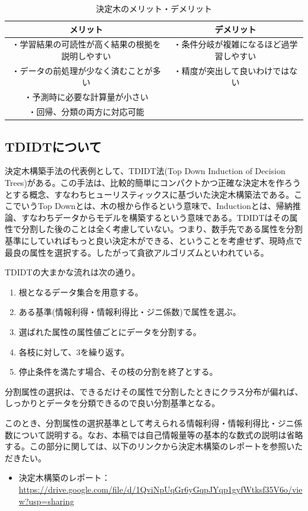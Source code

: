\documentclass[dvipdfmx]{jsarticle}
\begin{document}
\begin{table}[H]
  \begin{center}
    \caption{決定木のメリット・デメリット}
    \begin{tabular}{|c|c|} \hline
      メリット & デメリット \\ \hline
      ・学習結果の可読性が高く結果の根拠を説明しやすい & ・条件分岐が複雑になるほど過学習しやすい\\
      ・データの前処理が少なく済むことが多い & ・精度が突出して良いわけではない\\
      ・予測時に必要な計算量が小さい & \\
      ・回帰、分類の両方に対応可能 &　\\ \hline
    \end{tabular}
    \label{hyo01}
  \end{center}
\end{table}
\subsection{TDIDTについて}
決定木構築手法の代表例として、TDIDT法(Top Down Induction of Decision Trees)がある。この手法は、比較的簡単にコンパクトかつ正確な決定木を作ろうとする概念、すなわちヒューリスティックスに基づいた決定木構築法である。ここでいうTop Downとは、木の根から作るという意味で、Inductionとは、帰納推論、すなわちデータからモデルを構築するという意味である。TDIDTはその属性で分割した後のことは全く考慮していない。つまり、数手先である属性を分割基準にしていればもっと良い決定木ができる、ということを考慮せず、現時点で最良の属性を選択する。したがって貪欲アルゴリズムといわれている。\par
TDIDTの大まかな流れは次の通り。
\begin{enumerate}
  \item 根となるデータ集合を用意する。
  \item ある基準(情報利得・情報利得比・ジニ係数)で属性を選ぶ。
  \item 選ばれた属性の属性値ごとにデータを分割する。
  \item 各枝に対して、3を繰り返す。
  \item 停止条件を満たす場合、その枝の分割を終了とする。
\end{enumerate}
分割属性の選択は、できるだけその属性で分割したときにクラス分布が偏れば、しっかりとデータを分類できるので良い分割基準となる。\par
このとき、分割属性の選択基準として考えられる情報利得・情報利得比・ジニ係数について説明する。なお、本稿では自己情報量等の基本的な数式の説明は省略する。この部分に関しては、以下のリンクから決定木構築のレポートを参照いただきたい。
\begin{itemize}
  \item 決定木構築のレポート：\url{https://drive.google.com/file/d/1QviNpUqGr6yGqpJYqp1gyfWtksf35V6o/view?usp=sharing}
\end{itemize}
\end{document}
